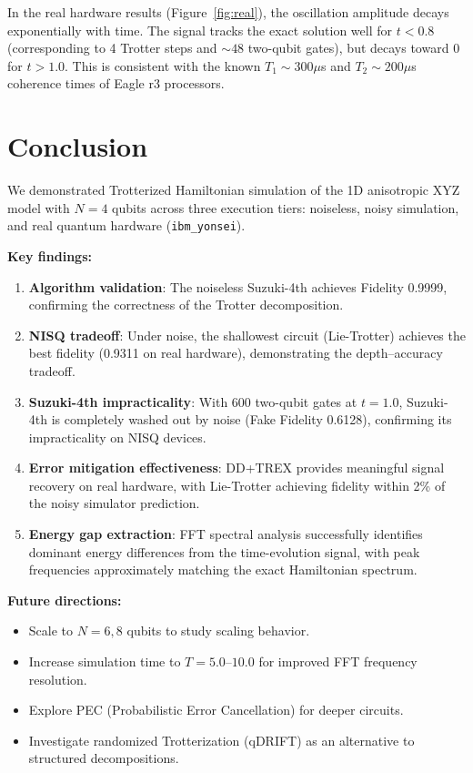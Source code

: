 \documentclass[11pt,a4paper]{article}
\begin{document}
In the real hardware results (Figure~\ref{fig:real}), the oscillation amplitude decays exponentially with time. The signal tracks the exact solution well for $t < 0.8$ (corresponding to 4 Trotter steps and $\sim 48$ two-qubit gates), but decays toward 0 for $t > 1.0$. This is consistent with the known $T_1 \sim 300\mu$s and $T_2 \sim 200\mu$s coherence times of Eagle r3 processors.

\section{Conclusion}

We demonstrated Trotterized Hamiltonian simulation of the 1D anisotropic XYZ model with $N=4$ qubits across three execution tiers: noiseless, noisy simulation, and real quantum hardware (\texttt{ibm\_yonsei}).

\textbf{Key findings:}
\begin{enumerate}
    \item \textbf{Algorithm validation}: The noiseless Suzuki-4th achieves Fidelity 0.9999, confirming the correctness of the Trotter decomposition.
    \item \textbf{NISQ tradeoff}: Under noise, the shallowest circuit (Lie-Trotter) achieves the best fidelity (0.9311 on real hardware), demonstrating the depth--accuracy tradeoff.
    \item \textbf{Suzuki-4th impracticality}: With $600$ two-qubit gates at $t=1.0$, Suzuki-4th is completely washed out by noise (Fake Fidelity 0.6128), confirming its impracticality on NISQ devices.
    \item \textbf{Error mitigation effectiveness}: DD+TREX provides meaningful signal recovery on real hardware, with Lie-Trotter achieving fidelity within 2\% of the noisy simulator prediction.
    \item \textbf{Energy gap extraction}: FFT spectral analysis successfully identifies dominant energy differences from the time-evolution signal, with peak frequencies approximately matching the exact Hamiltonian spectrum.
\end{enumerate}

\textbf{Future directions:}
\begin{itemize}
    \item Scale to $N=6,8$ qubits to study scaling behavior.
    \item Increase simulation time to $T=5.0$--$10.0$ for improved FFT frequency resolution.
    \item Explore PEC (Probabilistic Error Cancellation) for deeper circuits.
    \item Investigate randomized Trotterization (qDRIFT) as an alternative to structured decompositions.
\end{itemize}
\end{document}
